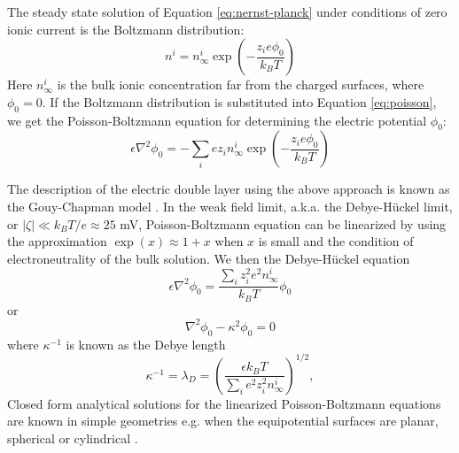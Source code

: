 The steady state solution of Equation \ref{eq:nernst-planck} under conditions of zero ionic current is the 
Boltzmann distribution:
\begin{equation}
n^i = n_\infty^i \exp \left( -\frac{z_i e \phi_0}{k_BT} \right)
\end{equation}
Here $n_\infty^i$ is the bulk ionic concentration far from the charged surfaces, where $\phi_0=0$.
If the Boltzmann distribution is substituted into Equation \ref{eq:poisson}, we get the Poisson-Boltzmann equation for determining the electric potential $\phi_0$:
\begin{equation}
\epsilon \nabla^2\phi_0 = -  \sum_i e z_i n_\infty^i \exp \left( -\frac{z_i e \phi_0}{k_BT} \right) 
\label{eq:poisson-boltzmann}
\end{equation}

The description of the electric double layer using the above approach is known as the Gouy-Chapman model \cite{ghosal2006electrokinetic}. 
In the weak field limit, a.k.a. the Debye-H\"{u}ckel limit, or $|\zeta|\ll k_BT/e\approx 25$ mV, Poisson-Boltzmann equation can be linearized by using the approximation $\exp (x ) \approx 1 + x$ when $x$ is small and the condition of electroneutrality of the bulk solution. We then the Debye-H\"{u}ckel equation 
\begin{equation}
\epsilon \nabla^2\phi_0 = \frac{\sum_i z_i^2 e^2 n_\infty^i}{k_BT} \phi_0
\end{equation}
or
\begin{equation} 
\nabla^2\phi_0 - \kappa^2 \phi_0 = 0
\end{equation}
where $\kappa^{-1}$ is known as the Debye length
\begin{equation}
\kappa^{-1}=\lambda_D=\left(\frac{\epsilon k_BT}{\sum_i e^2 z_i^2n_\infty^i}\right)^{1/2},
\end{equation}
Closed form analytical solutions for the linearized Poisson-Boltzmann equations are known in simple geometries e.g. when the equipotential surfaces are planar, spherical or cylindrical \cite{ghosal2006electrokinetic,ghosal2010mathematical}. 

